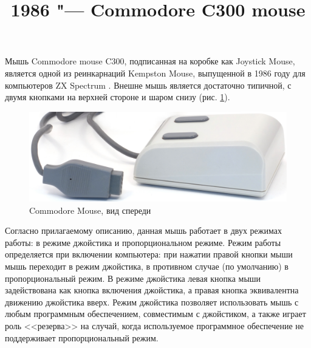 \documentclass[11pt, a4paper]{article}
\begin{document}
\title{1986 "--- Commodore C300 mouse}
\date{}
\maketitle

Мышь Commodore mouse C300, подписанная на коробке как Joystick Mouse, является одной из реинкарнаций Kempston Mouse, выпущенной в 1986 году для компьютеров ZX Spectrum \cite{SinclairUser}. Внешне мышь является достаточно типичной, с двумя кнопками на верхней стороне и шаром снизу (рис. \ref{fig:C300Pic}).

\begin{figure}[h]
    \centering
    \includegraphics[scale=0.7]{1986_commodore_c300_mouse/cmnirm_30.jpg}
    \caption{Commodore Mouse, вид спереди}
    \label{fig:C300Pic}
\end{figure}

Согласно прилагаемому описанию, данная мышь работает в двух режимах работы: в режиме джойстика и пропорциональном режиме. Режим работы определяется при включении компьютера: при нажатии правой кнопки мыши мышь переходит в режим джойстика, в противном случае (по умолчанию) в пропорциональный режим. В режиме джойстика левая кнопка мыши задействована как кнопка включения джойстика, а правая кнопка эквивалентна движению джойстика вверх. Режим джойстика позволяет использовать мышь с любым программным обеспечением, совместимым с джойстиком, а также играет роль <<резерва>> на случай, когда используемое программное обеспечение не поддерживает пропорциональный режим.
\end{document}
